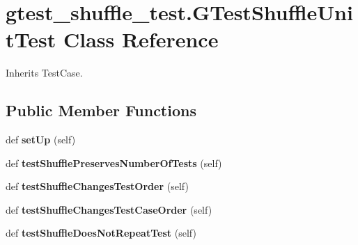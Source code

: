 \hypertarget{classgtest__shuffle__test_1_1GTestShuffleUnitTest}{}\section{gtest\+\_\+shuffle\+\_\+test.\+G\+Test\+Shuffle\+Unit\+Test Class Reference}
\label{classgtest__shuffle__test_1_1GTestShuffleUnitTest}


Inherits Test\+Case.

\subsection*{Public Member Functions}
\begin{DoxyCompactItemize}
\item 
\mbox{\label{classgtest__shuffle__test_1_1GTestShuffleUnitTest_adf9841ae9c86eaafc3c3f7c9690c7bd8}} 
def {\bfseries set\+Up} (self)
\item 
\mbox{\label{classgtest__shuffle__test_1_1GTestShuffleUnitTest_aafc33d6129c37043ef5c95dbe766a8db}} 
def {\bfseries test\+Shuffle\+Preserves\+Number\+Of\+Tests} (self)
\item 
\mbox{\label{classgtest__shuffle__test_1_1GTestShuffleUnitTest_a0ba25ee553b62281e16b6a28873abc01}} 
def {\bfseries test\+Shuffle\+Changes\+Test\+Order} (self)
\item 
\mbox{\label{classgtest__shuffle__test_1_1GTestShuffleUnitTest_a8a82320ea310d1e3660bef2efb665bd2}} 
def {\bfseries test\+Shuffle\+Changes\+Test\+Case\+Order} (self)
\item 
\mbox{\label{classgtest__shuffle__test_1_1GTestShuffleUnitTest_a7537baa50e9e14b430fb80eaf4ea18f6}} 
def {\bfseries test\+Shuffle\+Does\+Not\+Repeat\+Test} (self)
\item 
\mbox{\label{classgtest__shuffle__test_1_1GTestShuffleUnitTest_aeea745f7ce2ab19a067c5cde6e083ba7}} 

\end{DoxyCompactItemize}
